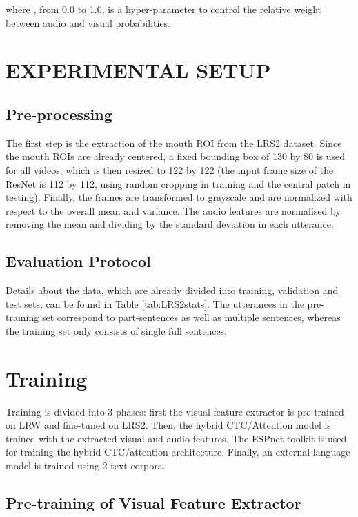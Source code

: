 \documentclass{article}
\begin{document}
 
where , from 0.0 to 1.0, is a hyper-parameter to control the relative weight between audio and visual probabilities. 

\section{EXPERIMENTAL SETUP}


\subsection{Pre-processing}
The first step is the extraction of the mouth ROI from the LRS2 dataset. Since the mouth ROIs are already centered, a fixed bounding box of 130 by 80 is used for all videos, which is then resized to 122 by 122 (the input frame size of the ResNet is 112 by 112, using random cropping in training and the central patch in testing). Finally, the frames are transformed to grayscale and are normalized with respect to the overall mean and variance. The audio features are normalised by removing the mean and dividing by the standard deviation in each utterance.



\subsection{Evaluation Protocol}
Details about the data, which are already divided into training, validation and test sets, can be found in Table \ref{tab:LRS2stats}.
The utterances in the pre-training set correspond to part-sentences as well as multiple sentences, whereas the training set only consists of single full sentences. 

\section{Training}
Training is divided into 3 phases: first the visual
feature extractor is pre-trained on LRW 
and fine-tuned on LRS2. Then, the hybrid CTC/Attention model is trained with
the extracted visual and audio features. The ESPnet toolkit \cite{espnet} is used for training the hybrid CTC/attention architecture. Finally, an external language model
is trained using 2 text corpora.



\subsection{Pre-training of Visual Feature Extractor}
\end{document}
